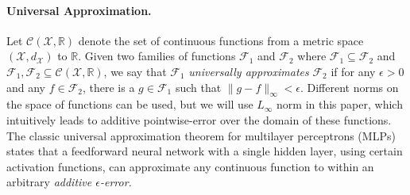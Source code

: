 \documentclass[12pt]{article}
\newcommand{\R}{\mathbb R}
\newtheorem{theorem}{Theorem}[section]
\newcommand{\yusu}[1]		{{ \textcolor{darkgreen} {{\sc [Yusu]:} #1}}}
\newcommand{\sam}[1]	{{\textcolor{darkblue}{{\sc Sam Says:} #1}}}
\begin{document}
\paragraph{Universal Approximation.}
Let $\mathcal{C}(\mathcal{X}, \R)$ denote the set of continuous functions from a metric space $(\mathcal{X}, d_{\mathcal{X}})$ to $\R$. Given two families of functions $\mathcal{F}_1$ and $\mathcal{F}_2$ where $\mathcal{F}_1 \subseteq \mathcal{F}_2$ and $\mathcal{F}_1, \mathcal{F}_2 \subseteq \mathcal{C}(\mathcal{X}, \R)$, we say that $\mathcal{F}_1$ \textit{universally approximates} $\mathcal{F}_2$ if for any $\epsilon> 0$ and any $f \in \mathcal{F}_2$, there is a $g \in \mathcal{F}_1$ such that $\|g - f\|_\infty < \epsilon$. Different norms on the space of functions can be used, but we will use $L_\infty$ norm in this paper, which intuitively leads to additive pointwise-error over the domain of these functions.
The classic universal approximation theorem for multilayer perceptrons (MLPs) \citep{cybenko1989approximation} states that a feedforward neural network with a single hidden layer, using certain activation functions, can approximate any continuous function to within an arbitrary \emph{additive $\epsilon$-error.} 
\end{document}
